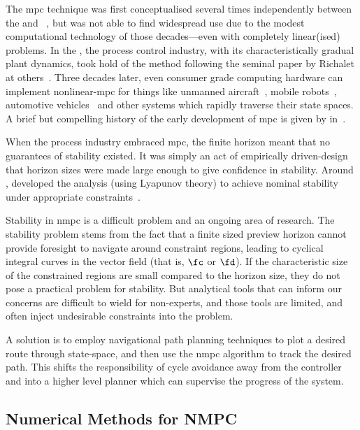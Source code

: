 The \ac{mpc} technique was first conceptualised several times independently
between the  and ~\cite{Grune2011,Camacho2007}, but
was not able to find widespread use due to the modest computational technology
of those decades—even with completely linear(ised) problems. In the
, the process control industry, with its characteristically gradual
plant dynamics, took hold of the method following the seminal paper by Richalet
at others~\cite{Richalet1978}. Three decades later, even consumer grade
computing hardware can implement nonlinear-\ac{mpc} for things like unmanned
aircraft~\cite{Eklund2005}, mobile robots~\cite{Teatro2014}, automotive
vehicles~\cite{Abbas2011} and other systems which rapidly traverse their state
spaces. A brief but compelling history of the early development of \ac{mpc} is
given by \citeauthor{Camacho2007} in~\cite{Camacho2007}.

When the process industry embraced \ac{mpc}, the finite horizon meant that no
guarantees of stability existed. It was simply an act of empirically
driven-design that horizon sizes were made large enough to give confidence in
stability. Around , \citeauthor{Mayne2000} developed the analysis
(using Lyapunov theory) to achieve nominal stability under appropriate
constraints~\cite{Mayne2000}.

Stability in \ac{nmpc} is a difficult problem and an ongoing area of research.
The stability problem stems from the fact that a finite sized preview horizon
cannot provide foresight to navigate around constraint regions, leading to
cyclical integral curves in the vector field (that is, $\fc$ or $\fd$). If the
characteristic size of the constrained regions are small compared to the horizon
size, they do not pose a practical problem for stability. But analytical tools
that can inform our concerns are difficult to wield for non-experts, and those
tools are limited, and often inject undesirable constraints into the problem.

A solution is to employ navigational path planning techniques to plot a desired
route through state-space, and then use the \ac{nmpc} algorithm to track the
desired path. This shifts the responsibility of cycle avoidance away from the
controller and into a higher level planner which can supervise the progress of
the system.



\subsection{Numerical Methods for NMPC}
\label{subsec:lit:numerical-methods}


